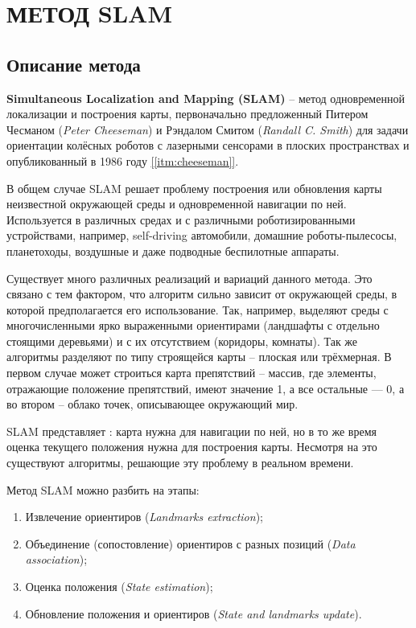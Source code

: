 \chapter{МЕТОД SLAM}

\section{Описание метода}

\textbf{Simultaneous Localization and Mapping (SLAM)} -- метод одновременной локализации и построения карты, первоначально предложенный Питером Чесманом (\textit{Peter Cheeseman}) и Рэндалом Смитом (\textit{Randall C. Smith}) для задачи ориентации колёсных роботов с лазерными сенсорами в плоских пространствах и опубликованный в 1986 году \hyperref[itm:cheeseman]{[\ref{itm:cheeseman}]}.

В общем случае SLAM решает проблему построения или обновления карты неизвестной окружающей среды и одновременной навигации по ней. Используется в различных средах и с различными роботизированными устройствами, например, self-driving автомобили, домашние роботы-пылесосы, планетоходы, воздушные и даже подводные беспилотные аппараты.

Существует много различных реализаций и вариаций данного метода. Это связано с тем фактором, что алгоритм сильно зависит от окружающей среды, в которой предполагается его использование. Так, например, выделяют среды с многочисленными ярко выраженными ориентирами (ландшафты с отдельно стоящими деревьями) и с их отсутствием (коридоры, комнаты). Так же алгоритмы разделяют по типу строящейся карты -- плоская или трёхмерная. В первом случае может строиться карта препятствий -- массив, где элементы, отражающие положение препятствий, имеют значение 1, а все остальные — 0, а во втором -- облако точек, описывающее окружающий мир.

SLAM представляет : карта нужна для навигации по ней, но в то же время оценка текущего положения нужна для построения карты. Несмотря на это существуют алгоритмы, решающие эту проблему в реальном времени.

Метод SLAM можно разбить на этапы:
\begin{enumerate}
    \item Извлечение ориентиров (\textit{Landmarks extraction});
    \item Объединение (сопостовление) ориентиров с разных позиций (\textit{Data association});
    \item Оценка положения (\textit{State estimation});
    \item Обновление положения и ориентиров (\textit{State and landmarks update}).
\end{enumerate}

